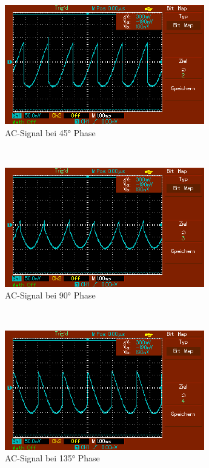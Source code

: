 \documentclass[captions=tableheading]{scrartcl}
\begin{document}
\begin{itemize}
            \begin{figure}
                \centering
                \includegraphics{Lock_In Bilder/Aufgabe 3/MAP002.pdf}
                \caption{AC-Signal bei 45° Phase}
                \label{fig:45sig2}
            \end{figure}
            \\
           
            \begin{figure}
                \centering
                \includegraphics{Lock_In Bilder/Aufgabe 3/MAP003.pdf}
                \caption{AC-Signal bei 90° Phase}
                \label{fig:90sig2}
            \end{figure}
            \\
            \newpage
          
            \begin{figure}
                \centering
                \includegraphics{Lock_In Bilder/Aufgabe 3/MAP004.pdf}
                \caption{AC-Signal bei 135° Phase}
                \label{fig:135sig2}
            \end{figure}
            \\
           

\end{itemize}
\end{document}
